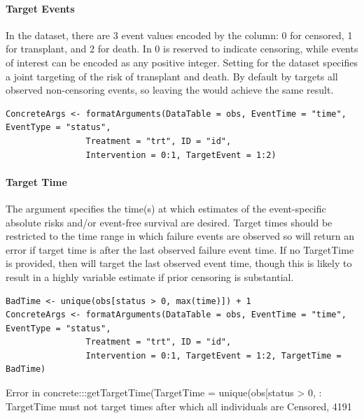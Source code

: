 \documentclass{report}
\newcommand{\1}{\ensuremath{\mathbf{1}}}
\begin{document}
\paragraph{Target Events}
\label{TargetEvent}
In the  dataset, there are 3 event values encoded by the  column: 0 for censored, 1 for transplant, and 2 for death. In  0 is reserved to indicate censoring, while events of interest can be encoded as any positive integer. Setting  for the  dataset specifies a joint targeting of the risk of transplant and death. By default  by targets all observed non-censoring events, so leaving the  would achieve the same result.

\begin{lstlisting}
ConcreteArgs <- formatArguments(DataTable = obs, EventTime = "time", EventType = "status", 
				Treatment = "trt", ID = "id", 
				Intervention = 0:1, TargetEvent = 1:2)
\end{lstlisting}

\paragraph{Target Time}
\label{TargetTime}
The  argument specifies the time(s) at which estimates of the event-specific absolute risks and/or event-free survival are desired. Target times should be restricted to the time range in which failure events are observed so  will return an error if target time is after the last observed failure event time. If no TargetTime is provided, then  will target the last observed event time, though this is likely to result in a highly variable estimate if prior censoring is substantial.

\begin{lstlisting}
BadTime <- unique(obs[status > 0, max(time)]) + 1
ConcreteArgs <- formatArguments(DataTable = obs, EventTime = "time", EventType = "status", 
				Treatment = "trt", ID = "id", 
				Intervention = 0:1, TargetEvent = 1:2, TargetTime = BadTime)
\end{lstlisting}

Error in concrete:::getTargetTime(TargetTime = unique(obs[status > 0,  : 
  TargetTime must not target times after which all individuals are Censored, 4191
\end{document}
